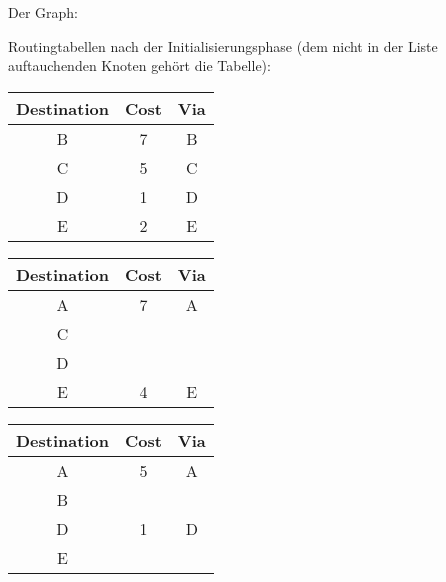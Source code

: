 \documentclass[a4paper,
			llpt,
			solution,
			accentcolor=tud2d,
			colorbacktitle
			]
			{tudexercise}
\newcommand{\8}{$\infty$}
\begin{document}
\begin{multicols}{3}
Der Graph:\\
\begin{center}
\end{center}
\columnbreak
Routingtabellen nach der Initialisierungsphase (dem nicht in der Liste auftauchenden Knoten gehört die Tabelle): \\
\begin{tabular}{c|c|c}
Destination & Cost & Via \\ \hline
B           & 7    & B   \\
C           & 5    & C   \\
D           & 1    & D   \\
E           & 2    & E   \\
\end{tabular}
\begin{tabular}{c|c|c}
Destination & Cost & Via \\ \hline
A           & 7    & A   \\
C           &      &     \\
D           &      &     \\
E           & 4    & E   \\
\end{tabular}
\begin{tabular}{c|c|c}
Destination & Cost & Via \\ \hline
A           & 5    & A   \\
B           &      &     \\
D           & 1    & D   \\
E           &      &     \\
\end{tabular}
\begin{tabular}{c|c|c}

\end{tabular}
\end{multicols}
\end{document}
